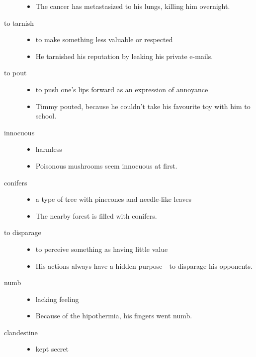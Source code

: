 \documentclass[a4paper]{article}
\begin{document}
\begin{description}
\begin{itemize}
        \item The cancer has metastasized to his lungs, killing him overnight.
    \end{itemize}
    \item[to tarnish] \begin{itemize}
        \item to make something less valuable or respected
        \item He tarnished his reputation by leaking his private e-mails.
    \end{itemize}
    \item[to pout] \begin{itemize}
        \item to push one's lips forward as an expression of annoyance
        \item Timmy pouted, because he couldn't take his favourite toy with him to school.
    \end{itemize}
    \item[innocuous] \begin{itemize}
        \item harmless
        \item Poisonous mushrooms seem innocuous at first.
    \end{itemize}
    \item[conifers] \begin{itemize}
        \item a type of tree with pinecones and needle-like leaves
        \item The nearby forest is filled with conifers.
    \end{itemize}
    \item[to disparage] \begin{itemize}
        \item to perceive something as having little value
        \item His actions always have a hidden purpose - to disparage his opponents.
    \end{itemize}
    \item[numb] \begin{itemize}
        \item lacking feeling
        \item Because of the hipothermia, his fingers went numb.
    \end{itemize}
    \item[clandestine] \begin{itemize}
        \item kept secret

\end{itemize}
\end{description}
\end{document}
